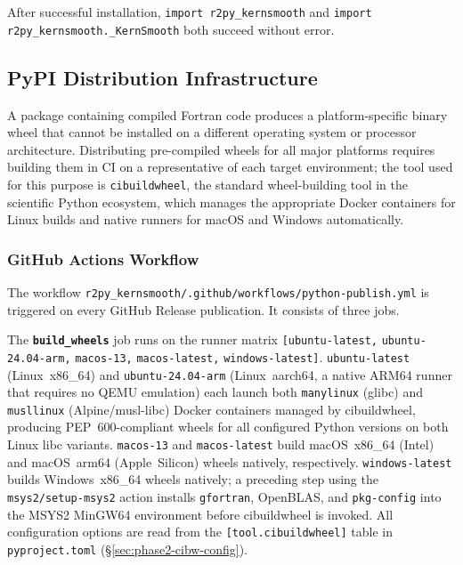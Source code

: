 \documentclass[12pt,a4paper]{article}
\begin{document}
After successful installation, \texttt{import r2py\_kernsmooth} and \texttt{import r2py\_kernsmooth.\_KernSmooth} both succeed without error.

\subsection{PyPI Distribution Infrastructure}

A package containing compiled Fortran code produces a platform-specific binary wheel that cannot be installed on a different operating system or processor architecture. Distributing pre-compiled wheels for all major platforms requires building them in CI on a representative of each target environment; the tool used for this purpose is \texttt{cibuildwheel}, the standard wheel-building tool in the scientific Python ecosystem, which manages the appropriate Docker containers for Linux builds and native runners for macOS and Windows automatically.

\subsubsection{GitHub Actions Workflow}
\label{sec:phase2-workflow}

The workflow \texttt{r2py\_kernsmooth/.github/workflows/python-publish.yml} is triggered on every GitHub Release publication. It consists of three jobs.

The \textbf{\texttt{build\_wheels}} job runs on the runner matrix \texttt{[ubuntu-latest,} \texttt{ubuntu-24.04-arm,} \texttt{macos-13,} \texttt{macos-latest,} \texttt{windows-latest]}. \texttt{ubuntu-latest} (Linux~x86\_64) and \texttt{ubuntu-24.04-arm} (Linux~aarch64, a native ARM64 runner that requires no QEMU emulation) each launch both \texttt{manylinux} (glibc) and \texttt{musllinux} (Alpine/musl-libc) Docker containers managed by cibuildwheel, producing PEP~600-compliant wheels for all configured Python versions on both Linux libc variants. \texttt{macos-13} and \texttt{macos-latest} build macOS~x86\_64 (Intel) and macOS~arm64 (Apple~Silicon) wheels natively, respectively. \texttt{windows-latest} builds Windows~x86\_64 wheels natively; a preceding step using the \texttt{msys2/setup-msys2} action installs \texttt{gfortran}, OpenBLAS, and \texttt{pkg-config} into the MSYS2 MinGW64 environment before cibuildwheel is invoked. All configuration options are read from the \texttt{[tool.cibuildwheel]} table in \texttt{pyproject.toml} (\S\ref{sec:phase2-cibw-config}).
\end{document}
